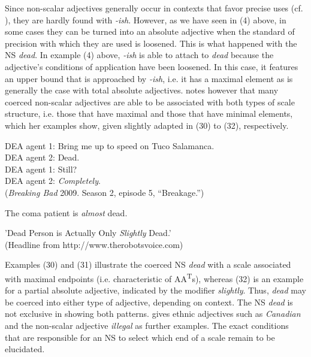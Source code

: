 \documentclass[output=paper
,modfonts
,nonflat]{langsci/langscibook}
\begin{document}
Since non-scalar adjectives generally occur in contexts that favor precise uses (cf. \textcite[95--96]{Burnett2017}), they are hardly found with \textit{-ish}. However, as we have seen in (4) above, in some cases they can be turned into an absolute adjective when the standard of precision with which they are used is loosened. This is what happened with the NS \textit{dead}. In example (4) above, \textit{-ish} is able to attach to \textit{dead} because the adjective's conditions of application have been loosened. In this case, it features an upper bound that is approached by \textit{-ish}, i.e. it has a maximal element as is generally the case with total absolute adjectives. \textcite[112--113]{Burnett2017} notes however that many coerced non-scalar adjectives are able to be associated with both types of scale structure, i.e. those that have maximal and those that have minimal elements, which her examples show, given slightly adapted in (30) to (32), respectively.

\begin{examples}
	\item DEA agent 1: Bring me up to speed on Tuco Salamanca. \\
		DEA agent 2: Dead. \\
		DEA agent 1: Still? \\
		DEA agent 2: \textit{Completely}. \\
		(\textit{Breaking Bad} 2009. Season 2, episode 5, ``Breakage.'')
	\item The coma patient is \textit{almost} dead.
	\item 'Dead Person is Actually Only \textit{Slightly} Dead.' \\ 
		(Headline from http://www.therobotsvoice.com)
\end{examples}

Examples (30) and (31) illustrate the coerced NS \textit{dead} with a scale associated with maximal endpoints (i.e. characteristic of AA\textsuperscript{T}s), whereas (32) is an example for a partial absolute adjective, indicated by the modifier \textit{slightly}. Thus, \textit{dead} may be coerced into either type of adjective, depending on context. The NS \textit{dead} is not exclusive in showing both patterns. \textcite[113]{Burnett2017} gives ethnic adjectives such as \textit{Canadian} and the non-scalar adjective \textit{illegal} as further examples. The exact conditions that are responsible for an NS to select which end of a scale remain to be elucidated.
\end{document}
